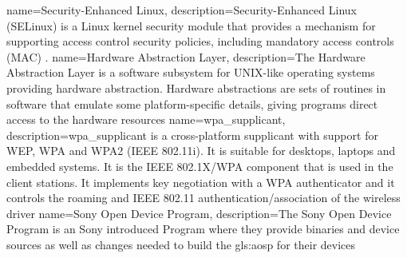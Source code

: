 { name=Security-Enhanced Linux,
	description={Security-Enhanced Linux (SELinux) is a Linux kernel security module that provides a mechanism for supporting access control security policies, including mandatory access controls (MAC) \citep{web:selinux}.}}
{ name=Hardware Abstraction Layer,
	description={The Hardware Abstraction Layer is a software subsystem for UNIX-like operating systems providing hardware abstraction. Hardware abstractions are sets of routines in software that emulate some platform-specific details, giving programs direct access to the hardware resources \citep{web:HALWikipedia}}}
{ name=wpa\_supplicant,
	description={wpa\_supplicant is a cross-platform supplicant with support for WEP, WPA and WPA2 (IEEE 802.11i). It is suitable for desktops, laptops and embedded systems. It is the IEEE 802.1X/WPA component that is used in the client stations. It implements key negotiation with a WPA authenticator and it controls the roaming and IEEE 802.11 authentication/association of the wireless driver \citep{web:ArchlinuxWikiWPASupplicant}}}
{ name=Sony Open Device Program,
	description={The Sony Open Device Program is an Sony introduced Program where they provide binaries and device sources as well as changes needed to build the \gls{gls:aosp} for their devices \citep{web:sodp}}}
